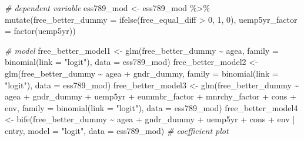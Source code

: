 \documentclass[
]{article}
\newenvironment{Shaded}{\begin{snugshade}}{\end{snugshade}}
\newcommand{\AttributeTok}[1]{\textcolor[rgb]{0.77,0.63,0.00}{#1}}
\newcommand{\CommentTok}[1]{\textcolor[rgb]{0.56,0.35,0.01}{\textit{#1}}}
\newcommand{\DecValTok}[1]{\textcolor[rgb]{0.00,0.00,0.81}{#1}}
\newcommand{\FunctionTok}[1]{\textcolor[rgb]{0.00,0.00,0.00}{#1}}
\newcommand{\NormalTok}[1]{#1}
\newcommand{\OtherTok}[1]{\textcolor[rgb]{0.56,0.35,0.01}{#1}}
\newcommand{\SpecialCharTok}[1]{\textcolor[rgb]{0.00,0.00,0.00}{#1}}
\newcommand{\StringTok}[1]{\textcolor[rgb]{0.31,0.60,0.02}{#1}}
\begin{document}
\begin{Shaded}
\begin{Highlighting}[]
\CommentTok{\# dependent variable}
\NormalTok{ess789\_mod }\OtherTok{\textless{}{-}}\NormalTok{ ess789\_mod }\SpecialCharTok{\%\textgreater{}\%}
  \FunctionTok{mutate}\NormalTok{(}\AttributeTok{free\_better\_dummy =} \FunctionTok{ifelse}\NormalTok{(free\_equal\_diff }\SpecialCharTok{\textgreater{}} \DecValTok{0}\NormalTok{, }\DecValTok{1}\NormalTok{, }\DecValTok{0}\NormalTok{),}
         \AttributeTok{uemp5yr\_factor =} \FunctionTok{factor}\NormalTok{(uemp5yr))}

\CommentTok{\# model }
\NormalTok{free\_better\_model1 }\OtherTok{\textless{}{-}} \FunctionTok{glm}\NormalTok{(free\_better\_dummy }\SpecialCharTok{\textasciitilde{}}\NormalTok{ agea,}
                         \AttributeTok{family =} \FunctionTok{binomial}\NormalTok{(}\AttributeTok{link =} \StringTok{"logit"}\NormalTok{),}
                         \AttributeTok{data =}\NormalTok{ ess789\_mod)}
\NormalTok{free\_better\_model2 }\OtherTok{\textless{}{-}} \FunctionTok{glm}\NormalTok{(free\_better\_dummy }\SpecialCharTok{\textasciitilde{}}\NormalTok{ agea }\SpecialCharTok{+}\NormalTok{ gndr\_dummy,}
                         \AttributeTok{family =} \FunctionTok{binomial}\NormalTok{(}\AttributeTok{link =} \StringTok{"logit"}\NormalTok{),}
                         \AttributeTok{data =}\NormalTok{ ess789\_mod)}
\NormalTok{free\_better\_model3 }\OtherTok{\textless{}{-}} \FunctionTok{glm}\NormalTok{(free\_better\_dummy }\SpecialCharTok{\textasciitilde{}}\NormalTok{ agea }\SpecialCharTok{+}\NormalTok{ gndr\_dummy }\SpecialCharTok{+}\NormalTok{ uemp5yr}
                          \SpecialCharTok{+}\NormalTok{ eummbr\_factor }\SpecialCharTok{+}\NormalTok{ mnrchy\_factor }\SpecialCharTok{+}\NormalTok{ cons }\SpecialCharTok{+}\NormalTok{ env,}
                         \AttributeTok{family =} \FunctionTok{binomial}\NormalTok{(}\AttributeTok{link =} \StringTok{"logit"}\NormalTok{),}
                         \AttributeTok{data =}\NormalTok{ ess789\_mod)}
\NormalTok{free\_better\_model4 }\OtherTok{\textless{}{-}} \FunctionTok{bife}\NormalTok{(free\_better\_dummy }\SpecialCharTok{\textasciitilde{}}\NormalTok{ agea }\SpecialCharTok{+}\NormalTok{ gndr\_dummy }\SpecialCharTok{+}\NormalTok{ uemp5yr }\SpecialCharTok{+}\NormalTok{ cons }\SpecialCharTok{+}\NormalTok{ env }\SpecialCharTok{|}\NormalTok{ cntry, }
                                 \AttributeTok{model =} \StringTok{"logit"}\NormalTok{, }\AttributeTok{data =}\NormalTok{ ess789\_mod)}
\CommentTok{\# coefficient plot }

\end{Highlighting}
\end{Shaded}
\end{document}
